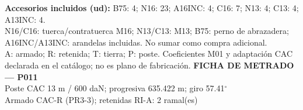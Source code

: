 \begingroup\scriptsize
\textbf{Accesorios incluidos (ud):} B75: 4; N16: 23; A16INC: 4; C16: 7; N13: 4; C13: 4; A13INC: 4.\\
N16/C16: tuerca/contratuerca M16; N13/C13: M13; B75: perno de abrazadera; A16INC/A13INC: arandelas incluidas. No sumar como compra adicional.\\
A: armado; R: retenida; T: tierra; P: poste. Coeficientes M01 y adaptación CAC declarada en el catálogo; no es plano de fabricación.
\endgroup\endgroup
\clearpage{}
\begingroup\small\setlength{\parskip}{3pt}\renewcommand{\arraystretch}{1.05}
\textbf{\large FICHA DE METRADO — P011}\\[4pt]
Poste CAC 13 m / 600 daN; progresiva 635.422 m; giro 57.41\ensuremath{^\circ}\\
Armado CAC-R (PR3-3); retenidas RI-A: 2 ramal(es)\\
\begingroup\scriptsize
